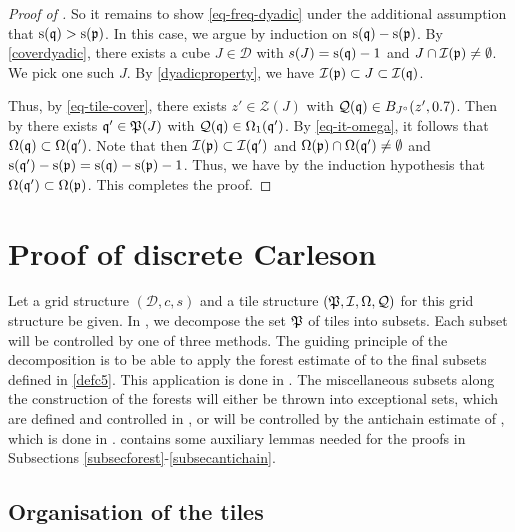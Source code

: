 \begin{proof}[Proof of ]
    So it remains to show \eqref{eq-freq-dyadic} under the additional assumption that ${\mathrm{s}}({\mathfrak q}) > {\mathrm{s}}({\mathfrak p})$. In this case, we argue by induction on ${\mathrm{s}}({\mathfrak q})-{\mathrm{s}}({\mathfrak p})$. By \eqref{coverdyadic}, there exists a cube $J \in \mathcal{D}$ with $s(J) = {\mathrm{s}}({\mathfrak q}) - 1$ and $J \cap{\mathcal{I}}({\mathfrak p}) \ne \emptyset$. We pick one such $J$. By \eqref{dyadicproperty}, we have ${\mathcal{I}}({\mathfrak p}) \subset J \subset {\mathcal{I}}({\mathfrak q})$.

    Thus, by \eqref{eq-tile-cover}, there exists $z' \in \mathcal{Z}(J)$ with ${\mathcal{Q}}({\mathfrak q}) \in B_{J^\circ}(z', 0.7)$. Then by  there exists ${\mathfrak q}' \in {\mathfrak P}(J)$ with ${\mathcal{Q}}({\mathfrak q}) \in\Omega_1({\mathfrak q}')$.
    By \eqref{eq-it-omega}, it follows that $\Omega({\mathfrak q}) \subset \Omega({\mathfrak q}')$. Note that then ${\mathcal{I}}({\mathfrak p}) \subset {\mathcal{I}}({\mathfrak q}')$ and ${\Omega}({\mathfrak p}) \cap {\Omega}({\mathfrak q}') \ne \emptyset$ and ${\mathrm{s}}({\mathfrak q}') - {\mathrm{s}}({\mathfrak p}) = {\mathrm{s}}({\mathfrak q}) - {\mathrm{s}}({\mathfrak p}) - 1$. Thus, we have by the induction hypothesis that $\Omega({\mathfrak q}') \subset \Omega({\mathfrak p})$. This completes the proof.
\end{proof}

\section{Proof of discrete Carleson}
\label{proptopropprop}



Let a grid structure $(\mathcal{D}, c, s)$ and a tile structure $({\mathfrak P}, {\mathcal{I}}, {\Omega}, {\mathcal{Q}})$ for this grid structure be given. In , we decompose the set ${\mathfrak P}$ of tiles into subsets. Each subset will be controlled by one of three methods. The guiding principle of the decomposition is to be able to apply the forest estimate of  to the final subsets defined in \eqref{defc5}. This application is done in . The miscellaneous subsets along the construction of the forests will either be thrown into exceptional sets, which are defined and controlled in , or will be controlled by the antichain estimate of , which is done in .  contains some auxiliary lemmas needed for the proofs in Subsections \ref{subsecforest}-\ref{subsecantichain}.

\subsection{Organisation of the tiles}\label{subsectilesorg}

